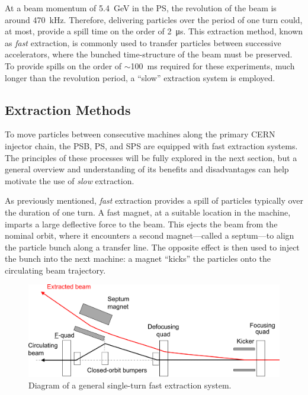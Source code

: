\documentclass[11pt]{report}
\begin{document}
At a beam momentum of \qty{5.4}{\giga\electronvolt} in the PS, the revolution of the beam is around \qty{470}{kHz}. Therefore, delivering particles over the period of one turn could, at most, provide a spill time on the order of \qty{2}{\micro\second}. This extraction method, known as \textit{fast} extraction, is commonly used to transfer particles between successive accelerators, where the bunched time-structure of the beam must be preserved. To provide spills on the order of $\sim$\qty{100}{\ms} required for these experiments, much longer than the revolution period, a ``slow'' extraction system is employed.

\subsection{Extraction Methods}

To move particles between consecutive machines along the primary CERN injector chain, the PSB, PS, and SPS are equipped with fast extraction systems. The principles of these processes will be fully explored in the next section, but a general overview and understanding of its benefits and disadvantages can help motivate the use of \textit{slow} extraction. 

As previously mentioned, \textit{fast} extraction provides a spill of particles typically over the duration of one turn. A fast magnet, at a suitable location in the machine, imparts a large deflective force to the beam. This ejects the beam from the nominal orbit, where it encounters a second magnet---called a septum---to align the particle bunch along a transfer line. The opposite effect is then used to inject the bunch into the next machine: a magnet ``kicks'' the particles onto the circulating beam trajectory.

\begin{figure}[h]
  \centering
  \includegraphics[width=\linewidth]{fast.png}
  \caption{Diagram of a general single-turn fast extraction system.~\cite{Fraser:CAS}}
  \label{fig:fast_diagram}
\end{figure}
\end{document}

